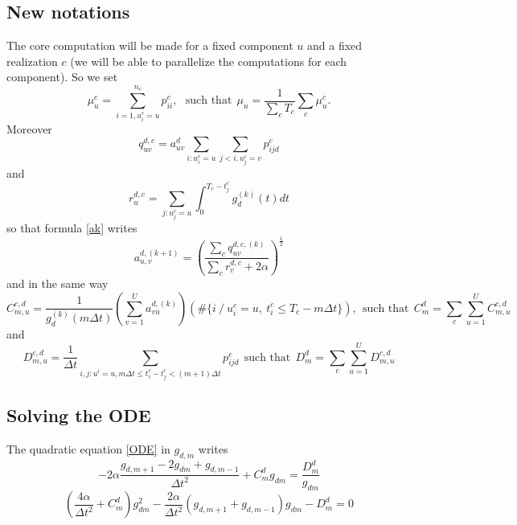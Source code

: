 \documentclass[11pt]{article}%
\begin{document}
\subsection{New notations}
The core computation will be made for a fixed component $u$ and a fixed realization $c$ (we will be able to parallelize the computations for each component).
So we set
\begin{equation}
\mu_u^c = \sum_{i=1,u_i^c=u}^{n_c} p_{ii}^c, ~~~\mbox{such that}~~
\mu_u = \frac{1}{\sum_c T_c} \sum_c \mu_u^c.
\end{equation}
Moreover
\begin{equation}
q_{uv}^{d,c} = a_{uv}^d \sum_{i:u_i^c=u} \sum_{j<i,u_j^c = v} p_{ijd}^c
\end{equation}
and
\begin{equation}
r_u^{d,c} = \sum_{j:u_j^c=u} \int_0^{T_c-t_j^c} g_d^{(k)}(t)dt
\end{equation}
so that formula \eqref{ak} writes
\begin{equation}
a_{u,v}^{d,(k+1)} = 
\left( 
\frac 
{\sum_c q_{uv}^{d,c,(k)}}
{\sum_c r_{v}^{d,c} + 2\alpha}
\right)^{\frac 1 2}
\end{equation}
and in the same way
\begin{equation}
C_{m,u}^{c,d} = 
\frac{1}{g_d^{(k)}(m\Delta t)}  
\left(\sum_{v=1}^U a_{vu}^{d,(k)}\right)
\left(\#\{i~/ ~u_i^c=u,~t_i^c\le T_c-m\Delta t\}\right),~~\mbox{such that}~~C_{m}^d = \sum_c \sum_{u=1}^U C_{m,u}^{c,d}
\end{equation} 
and 
\begin{equation}
D_{m,u}^{c,d} = \frac 1 {\Delta t} \sum_{i,j:u^i = u, m\Delta t \le t_i^c-t_j^c<(m+1)\Delta t} p_{ijd}^c~~\mbox{such that}~~D_{m}^d = \sum_c \sum_{u=1}^U D_{m,u}^{c,d}
\end{equation} 

\subsection{Solving the ODE}
The quadratic equation \eqref{ODE} in $g_{d,m}$  writes
\begin{equation}
-2\alpha \frac{g_{d,m+1} -2g_{dm}+g_{d,m-1}}{\Delta t^2} + C_{m}^dg_{dm} = \frac{D_{m}^d}{g_{dm}}
\end{equation}
\begin{equation}
\left(\frac{4\alpha}{\Delta t^2} + C_{m}^d\right) g_{dm}^2
-\frac{2\alpha}{\Delta t^2} 
\left(
 g_{d,m+1} +g_{d,m-1}
 \right)g_{dm} 
  - D_{m}^d = 0
\end{equation}
\end{document}
